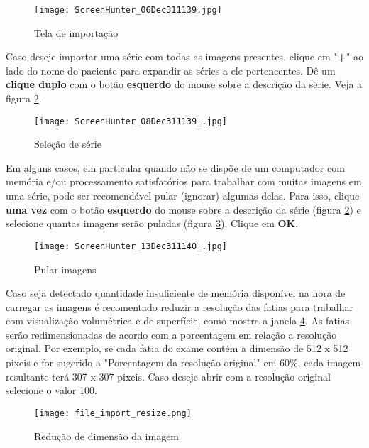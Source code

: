 \begin{figure}[!htb]
\centering
\texttt{[image: ScreenHunter\_06Dec311139.jpg]}
\caption{Tela de importação}
\label{fig:win_import}
\end{figure}

\newpage

Caso deseje importar uma série com todas as imagens presentes, clique em "\textbf{+}" ao
lado do nome do paciente para expandir as séries a ele pertencentes. Dê um \textbf{clique duplo}
com o botão \textbf{esquerdo} do mouse sobre a descrição da série. Veja a figura
\ref{fig:import_serie}.

\begin{figure}[!htb]
\centering
\texttt{[image: ScreenHunter\_08Dec311139\_.jpg]}
\caption{Seleção de série}
\label{fig:import_serie}
\end{figure}
 

Em alguns casos, em particular quando não se dispõe de um computador com memória e/ou
processamento satisfatórios para trabalhar com muitas imagens em uma série, pode ser
recomendável pular (ignorar) algumas delas. Para isso, clique \textbf{uma vez} com o botão
\textbf{esquerdo} do mouse sobre a descrição da série (figura \ref{fig:import_serie}) e selecione
quantas imagens serão puladas (figura \ref{fig:skip_image}). Clique em \textbf{OK}.

\begin{figure}[!htb]
\centering
\texttt{[image: ScreenHunter\_13Dec311140\_.jpg]}
\caption{Pular imagens}
\label{fig:skip_image}
\end{figure}


Caso seja detectado quantidade insuficiente de memória disponível na hora de carregar as imagens é recomentado 
reduzir a resolução das fatias para trabalhar com visualização volumétrica e de superfície, como mostra a janela \ref{fig:resize_image}. 
As fatias serão redimensionadas de acordo com a porcentagem em relação a resolução original. Por exemplo, 
se cada fatia do exame contém a dimensão de 512 x 512 pixeis e for sugerido a "Porcentagem da resolução original" em 60\%, 
cada imagem resultante terá 307 x 307 pixeis. Caso deseje abrir com a resolução original selecione o valor 100.

\begin{figure}[!htb]
\centering
\texttt{[image: file\_import\_resize.png]}
\caption{Redução de dimensão da imagem}
\label{fig:resize_image}
\end{figure}

